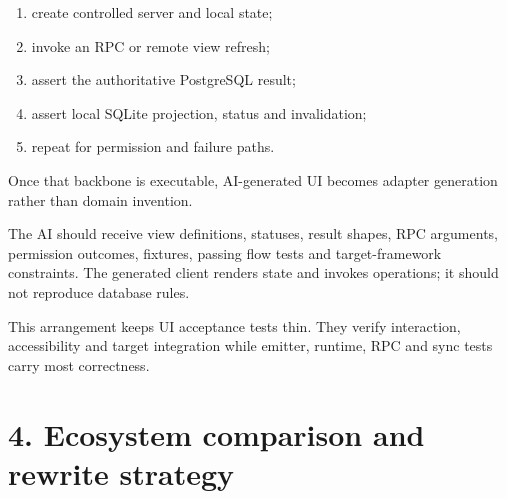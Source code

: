\documentclass[10pt]{article}
\begin{document}
\begin{enumerate}
  \item create controlled server and local state;
  \item invoke an RPC or remote view refresh;
  \item assert the authoritative PostgreSQL result;
  \item assert local SQLite projection, status and invalidation;
  \item repeat for permission and failure paths.
\end{enumerate}

Once that backbone is executable, AI-generated UI becomes adapter generation rather than domain invention.

\begin{center}
\end{center}

The AI should receive view definitions, statuses, result shapes, RPC arguments, permission outcomes, fixtures, passing flow tests and target-framework constraints. The generated client renders state and invokes operations; it should not reproduce database rules.

This arrangement keeps UI acceptance tests thin. They verify interaction, accessibility and target integration while emitter, runtime, RPC and sync tests carry most correctness.

\newpage
\section{4. Ecosystem comparison and rewrite strategy}
\end{document}
